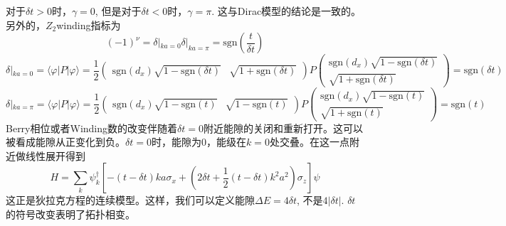 \documentclass{article}
\numberwithin{equation}{subsection}
\newcommand{\sgn}{\mathrm{sgn}}
\begin{document}
对于$\delta t>0$时，$\gamma=0$, 但是对于$\delta t<0$时，$\gamma=\pi$. 这与Dirac模型的结论是一致的。另外的，$Z_2$winding指标为
\begin{equation}
    (-1)^\nu=\delta|_{ka=0}\delta|_{ka=\pi}=\sgn(\frac{t}{\delta t})
\end{equation}
\begin{equation}
    \delta|_{ka=0}=\langle\varphi|P|\varphi\rangle=\frac{1}{2}\begin{pmatrix}
        \sgn(d_x)\sqrt{1-\sgn(\delta t)}&\sqrt{1+\sgn(\delta t)}
    \end{pmatrix}P\begin{pmatrix}
        \sgn(d_x)\sqrt{1-\sgn(\delta t)}\\
        \sqrt{1+\sgn(\delta t)}
    \end{pmatrix}=\sgn(\delta t)
\end{equation}
\begin{equation}
    \delta|_{ka=\pi}=\langle\varphi|P|\varphi\rangle=\frac{1}{2}\begin{pmatrix}
        \sgn(d_x)\sqrt{1-\sgn(t)}&\sqrt{1-\sgn(t)}
    \end{pmatrix}P\begin{pmatrix}
        \sgn(d_x)\sqrt{1-\sgn(t)}\\
        \sqrt{1+\sgn(t)}
    \end{pmatrix}=\sgn(t)
\end{equation}
Berry相位或者Winding数的改变伴随着$\delta t=0$附近能隙的关闭和重新打开。这可以被看成能隙从正变化到负。$\delta t=0$时，能隙为$0$，能级在$k=0$处交叠。在这一点附近做线性展开得到
\begin{equation}
    H=\sum_{k}\psi_k^\dagger[-(t-\delta t)ka\sigma_x+(2\delta t+\frac{1}{2}(t-\delta t)k^2a^2)\sigma_z]\psi
\end{equation}
这正是狄拉克方程的连续模型。这样，我们可以定义能隙$\Delta E=4\delta t$, 不是$4|\delta t|$. $\delta t$的符号改变表明了拓扑相变。
\end{document}
